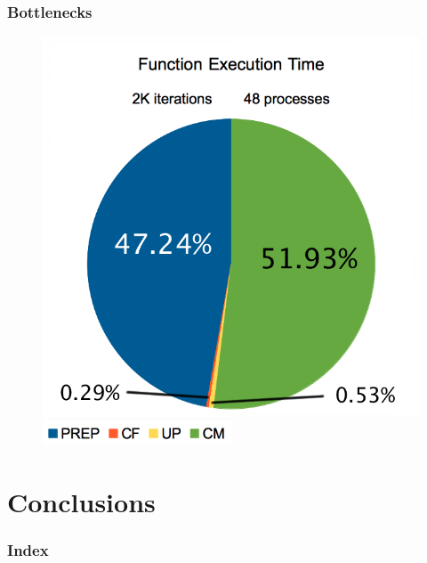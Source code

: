 \documentclass{beamer}
\begin{document}
\begin{frame}
	\frametitle{Bottlenecks}
	\begin{figure}
		\begin{center}
			\includegraphics[height=0.75\textheight]{images/may/load48.png}
			
			\includegraphics[width=0.5\textwidth]{images/may/legend.png}
		\end{center}
	\end{figure}
\end{frame}



%
%
%
%

\section{Conclusions}

\begin{frame}
	\frametitle{Index}
	\tableofcontents[currentsection]
\end{frame}
\end{document}
